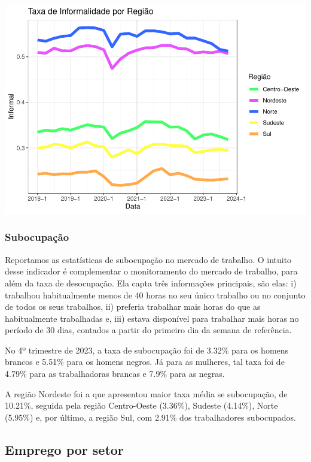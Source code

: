 \documentclass[
]{article}
\begin{document}
\includegraphics{R-Markdown--Long-Version-_files/figure-latex/unnamed-chunk-17-1.pdf}

\hypertarget{subocupauxe7uxe3o}{%
\subsubsection{Subocupação}\label{subocupauxe7uxe3o}}

Reportamos as estatísticas de subocupação no mercado de trabalho. O
intuito desse indicador é complementar o monitoramento do mercado de
trabalho, para além da taxa de desocupação. Ela capta três informações
principais, são elas: i) trabalhou habitualmente menos de 40 horas no
seu único trabalho ou no conjunto de todos os seus trabalhos, ii)
preferia trabalhar mais horas do que as habitualmente trabalhadas e,
iii) estava disponível para trabalhar mais horas no período de 30 dias,
contados a partir do primeiro dia da semana de referência.

No 4º trimestre de 2023, a taxa de subocupação foi de 3.32\% para os
homens brancos e 5.51\% para os homens negros. Já para as mulheres, tal
taxa foi de 4.79\% para as trabalhadoras brancas e 7.9\% para as negras.

A região Nordeste foi a que apresentou maior taxa média se subocupação,
de 10.21\%, seguida pela região Centro-Oeste (3.36\%), Sudeste (4.14\%),
Norte (5.95\%) e, por último, a região Sul, com 2.91\% dos trabalhadores
subocupados.

\hypertarget{emprego-por-setor}{%
\subsection{Emprego por setor}\label{emprego-por-setor}}
\end{document}
